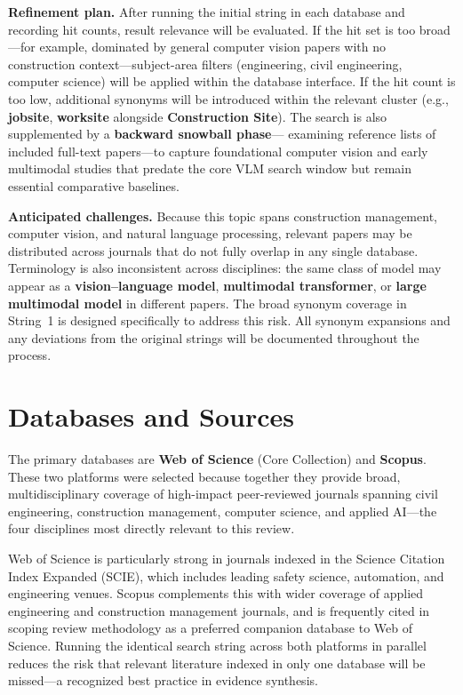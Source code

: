 \documentclass[12pt, letterpaper]{article}
\begin{document}
\noindent\textbf{Refinement plan.} After running the initial string in each
database and recording hit counts, result relevance will be evaluated. If the
hit set is too broad---for example, dominated by general computer vision papers
with no construction context---subject-area filters (engineering, civil
engineering, computer science) will be applied within the database interface.
If the hit count is too low, additional synonyms will be introduced within the
relevant cluster (e.g., \textbf{jobsite}, \textbf{worksite} alongside
\textbf{Construction Site}).
The search is also supplemented by a \textbf{backward snowball phase}---
examining reference lists of included full-text papers---to capture foundational
computer vision and early multimodal studies that predate the core VLM search
window but remain essential comparative baselines.

\noindent\textbf{Anticipated challenges.} Because this topic spans construction
management, computer vision, and natural language processing, relevant papers
may be distributed across journals that do not fully overlap in any single
database. Terminology is also inconsistent across disciplines: the same class
of model may appear as a \textbf{vision--language model}, \textbf{multimodal
transformer}, or \textbf{large multimodal model} in different papers. The broad
synonym coverage in String~1 is designed specifically to address this risk.
All synonym expansions and any deviations from the original strings will be
documented throughout the process.

\section{Databases and Sources}

The primary databases are \textbf{Web of Science} (Core Collection) and
\textbf{Scopus}. These two platforms were selected because together they
provide broad, multidisciplinary coverage of high-impact peer-reviewed journals
spanning civil engineering, construction management, computer science, and
applied AI---the four disciplines most directly relevant to this review.

Web of Science is particularly strong in journals indexed in the Science
Citation Index Expanded (SCIE), which includes leading safety science,
automation, and engineering venues. Scopus complements this with wider coverage
of applied engineering and construction management journals, and is frequently
cited in scoping review methodology as a preferred companion database to Web
of Science. Running the identical search string across both platforms in
parallel reduces the risk that relevant literature indexed in only one database
will be missed---a recognized best practice in evidence synthesis.
\end{document}
